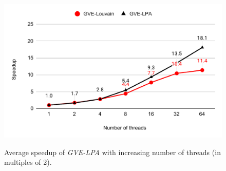 \begin{figure}[hbtp]
  \centering
  \includegraphics[width=0.98\linewidth]{out/rak-ss.pdf} \\[0ex]
  \caption{Average speedup of \textit{GVE-LPA} with increasing number of threads (in multiples of 2).}
  \label{fig:rak-ss}
\end{figure}
